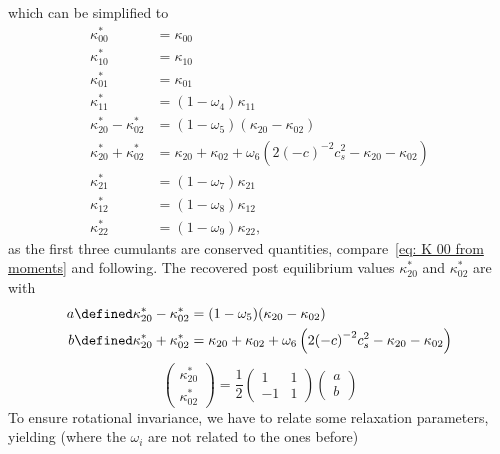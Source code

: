 which can be simplified to
\begin{equation}
  \begin{aligned}
    \kappa_{00}^{*} & = \kappa_{00} \\
    \kappa_{10}^{*} & = \kappa_{10} \\
    \kappa_{01}^{*} & = \kappa_{01} \\
    \kappa_{11}^{*} & = (1-\omega_4)\kappa_{11} \\
    \kappa_{20}^{*} - \kappa_{02}^{*}
      & = (1-\omega_5) (\kappa_{20} - \kappa_{02}) \\
    \kappa_{20}^{*} + \kappa_{02}^{*}
      & = \kappa_{20} + \kappa_{02} + \omega_6 \left( 2 {(-c)}^{-2} c_s^2 - \kappa_{20} - \kappa_{02} \right) \\
    \kappa_{21}^{*} & = (1-\omega_7)\kappa_{21} \\
    \kappa_{12}^{*} & = (1-\omega_8)\kappa_{12} \\
    \kappa_{22}^{*} & = (1-\omega_9)\kappa_{22},
  \end{aligned}
\end{equation}
as the first three cumulants are conserved quantities, compare~\eqref{eq: K 00 from moments} and following.
%
The recovered post equilibrium values $\kappa_{20}^{*}$ and $\kappa_{02}^{*}$ are with
\begin{equation}
  \begin{aligned}
    a \defined \kappa_{20}^{*} - \kappa_{02}^{*}
      & = (1-\omega_5) (\kappa_{20} - \kappa_{02}) \\
    b \defined \kappa_{20}^{*} + \kappa_{02}^{*}
      & = \kappa_{20} + \kappa_{02} + \omega_6 \left( 2 {(-c)}^{-2} c_s^2 - \kappa_{20} - \kappa_{02} \right)
  \end{aligned}
\end{equation}
\begin{equation}
  \begin{pmatrix}
    \kappa_{20}^{*} \\
    \kappa_{02}^{*}
  \end{pmatrix}
  = \frac{1}{2}
  \begin{pmatrix}
    1 & 1 \\ -1 & 1
  \end{pmatrix}
  \begin{pmatrix}
    a\\
    b
  \end{pmatrix}
\end{equation}
To ensure rotational invariance, we have to relate some relaxation parameters, yielding (where the $\omega_i$ are not related to the ones before)

